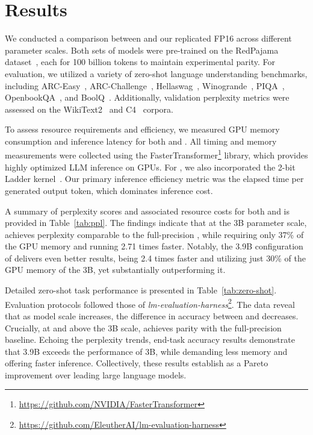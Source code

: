 \section{Results}

We conducted a comparison between  and our replicated FP16  across different parameter scales. Both sets of models were pre-trained on the RedPajama dataset~\cite{redpajama}, each for 100 billion tokens to maintain experimental parity. For evaluation, we utilized a variety of zero-shot language understanding benchmarks, including ARC-Easy~\cite{arc}, ARC-Challenge~\cite{arc}, Hellaswag~\cite{hellaswag}, Winogrande~\cite{winoGrande}, PIQA~\cite{piqa}, OpenbookQA~\cite{openbookqa}, and BoolQ~\cite{boolq}. Additionally, validation perplexity metrics were assessed on the WikiText2~\cite{wikitext2} and C4~\cite{c4} corpora.

To assess resource requirements and efficiency, we measured GPU memory consumption and inference latency for both  and . All timing and memory measurements were collected using the FasterTransformer\footnote{\url{https://github.com/NVIDIA/FasterTransformer}} library, which provides highly optimized LLM inference on GPUs. For , we also incorporated the 2-bit Ladder kernel~\cite{ladder}. Our primary inference efficiency metric was the elapsed time per generated output token, which dominates inference cost.

A summary of perplexity scores and associated resource costs for both  and  is provided in Table~\ref{tab:ppl}. The findings indicate that at the 3B parameter scale,  achieves perplexity comparable to the full-precision , while requiring only 37\% of the GPU memory and running 2.71 times faster. Notably, the 3.9B configuration of  delivers even better results, being 2.4 times faster and utilizing just 30\% of the GPU memory of the  3B, yet substantially outperforming it.

Detailed zero-shot task performance is presented in Table~\ref{tab:zero-shot}. Evaluation protocols followed those of \emph{lm-evaluation-harness}\footnote{\url{https://github.com/EleutherAI/lm-evaluation-harness}}. The data reveal that as model scale increases, the difference in accuracy between  and  decreases. Crucially, at and above the 3B scale,  achieves parity with the full-precision baseline. Echoing the perplexity trends, end-task accuracy results demonstrate that  3.9B exceeds the performance of  3B, while demanding less memory and offering faster inference. Collectively, these results establish  as a Pareto improvement over leading large language models.

